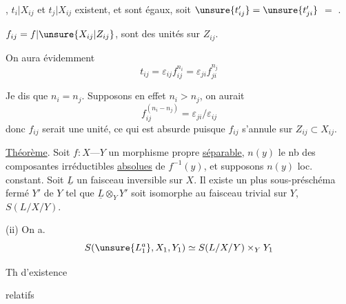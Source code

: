 , $t_i|X_{ij}$ et $t_j|X_{ij}$ existent, et sont égaux, soit $\unsure{t'_{ij}}=\unsure{t'_{ji}}$  $=$ .

  $f_{ij}=f|\unsure{X_{ij}|Z_{ij}}$,  sont des unités sur $Z_{ij}$.

On aura évidemment
\[
t_{ij}=\varepsilon_{ij}f_{ij}^{n_i}=\varepsilon_{ji}f_{ji}^{n_j}
\]

  Je dis que $n_i=n_j$. Supposons en effet $n_i>n_j$, on aurait  
\[
f_{ij}^{(n_i-n_j)}=\varepsilon_{ji}/\varepsilon_{ij}
\]
donc $f_{ij}$ serait une unité, ce qui  est absurde puisque $f_{ij}$ s'annule sur $Z_{ij}\subset X_{ij}$.

\uline{Théorème}. Soit $f:X\text{---}Y$ un morphisme propre  \uline{séparable},   $n(y)$ le nb des composantes irréductibles \uline{absolues} de $f^{-1}(y)$, et supposons $n(y)$ loc. constant. Soit $\underline L$ un faisceau inversible sur $X$.   Il existe un plus  sous-préschéma  fermé $Y'$ de $Y$ tel que $\underline L\otimes_Y Y'$ soit isomorphe au faisceau trivial sur $Y$,   $S(L/X/Y)$.

(ii) On a.
\[
S(\unsure{L_1^a},X_1,Y_1)\simeq S(L/X/Y)\times_Y Y_1
\]

Th d'existence

relatifs


